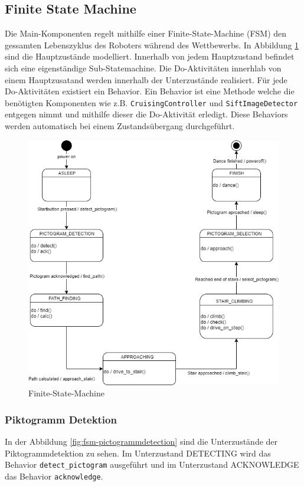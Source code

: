 \subsection{Finite State Machine}
\label{sec:fsm}
Die Main-Komponenten regelt mithilfe einer Finite-State-Machine (FSM) den gessamten Lebenszyklus des Roboters während des Wettbewerbs. In Abbildung \ref{fig:fsm} sind die Hauptzustände modelliert. Innerhalb von jedem Hauptzustand befindet sich eine eigenständige Sub-Statemachine. Die Do-Aktivitäten innerhlab von einem Hauptzusatand werden innerhalb der Unterzustände realisiert. Für jede Do-Aktivitäten existiert ein Behavior. Ein Behavior ist eine Methode welche die benötigten Komponenten wie z.B. \texttt{CruisingController} und \texttt{SiftImageDetector} entgegen nimmt und mithilfe dieser die Do-Aktivität erledigt. Diese Behaviors werden automatisch bei einem Zustandsübergang durchgeführt.

\begin{figure}[H]
  \includegraphics[width=1\textwidth]{img/softwarearchitektur/FSM-FSM.png}
  \centering
  \caption{Finite-State-Machine}
  \label{fig:fsm}
\end{figure}

\subsubsection{Piktogramm Detektion}
In der Abbildung \ref{fig:fsm-pictogrammdetection} sind die Unterzustände der Piktogrammdetektion zu sehen. Im Unterzustand DETECTING wird das Behavior \texttt{detect\_pictogram} ausgeführt und im Unterzustand ACKNOWLEDGE das Behavior \texttt{acknowledge}.

